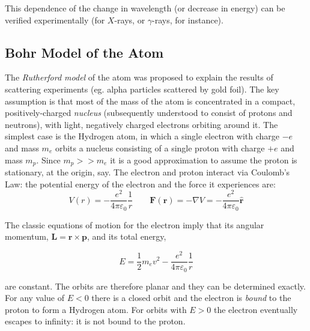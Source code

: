 \documentclass[a4paper]{article}
\begin{document}
\begin{center}
\end{center}

This dependence of the change in wavelength (or decrease in energy) can be verified experimentally (for $ X $-rays, or $ \gamma $-rays, for instance). 

\subsection{Bohr Model of the Atom}

The \emph{Rutherford model} of the atom was proposed to explain the results of scattering experiments (eg. alpha particles scattered by gold foil). The key assumption is that most of the mass of the atom is concentrated in a compact, positively-charged \emph{nucleus} (subsequently understood to consist of protons and neutrons), with light, negatively charged electrons orbiting around it. The simplest case is the Hydrogen atom, in which a single electron with charge $ - e $ and mass $ m_{e} $ orbits a nucleus consisting of a single proton with charge $ +e $ and mass $ m_{p} $. Since $ m_{p} >> m_{e} $ it is a good approximation to assume the proton is stationary, at the origin, say. The electron and proton interact via Coulomb's Law: the potential energy of the electron and the force it experiences are:
\[ V(r) = - \frac{e^{2}}{4\pi \varepsilon_{0}} \frac{1}{r} \qquad \mathbf{F}(\mathbf{r}) =  - \nabla V = - \frac{e^{2}}{4\pi \varepsilon_{0}} \hat{\mathbf{r}}\]

The classic equations of motion for the electron imply that its angular momentum, $ \mathbf{L} = \mathbf{r} \times \mathbf{p} $, and its total energy,

\[ E = \frac{1}{2} m_{e} v^{2} - \frac{e^{2}}{4 \pi \varepsilon_{0}} \frac{1}{r}  \]

are constant. The orbits are therefore planar and they can be determined exactly. For any value of $ E < 0 $ there is a closed orbit and the electron is \emph{bound} to the proton to form a Hydrogen atom. For orbits with $ E > 0 $ the electron eventually escapes to infinity: it is not bound to the proton.
\end{document}
